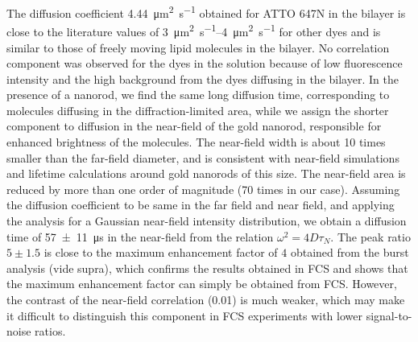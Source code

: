 The diffusion coefficient \SI{4.44}{\um\squared\per\s} obtained for ATTO 647N in the bilayer is close to the literature values of \SIrange{3}{4}{\um\squared\per\s}\cite{mach2010lipid} for other dyes and is similar to those of freely moving lipid molecules in the bilayer.
No correlation component was observed for the dyes in the solution because of low fluorescence intensity and the high background from the dyes diffusing in the bilayer.
In the presence of a nanorod, we find the same long diffusion time, corresponding to molecules diffusing in the diffraction-limited area, while we assign the shorter component to diffusion in the near-field of the gold nanorod, responsible for enhanced brightness of the molecules.
The near-field width is about 10 times smaller than the far-field diameter, and is consistent with near-field simulations and lifetime calculations around gold nanorods
of this size.\cite{khatua2014resonant,seelig2007nanoparticleinduced}
The near-field area is reduced by more than one order of magnitude (70 times in our case).
Assuming the diffusion coefficient to be same in the far field and near field, and applying the analysis for a Gaussian near-field intensity distribution, we obtain a diffusion 
time of \SI[separate-uncertainty = true]{57(11)}{\us} in the near-field from the relation $\omega^2=4D\tau_N$.
The peak ratio $5\pm1.5$ is close to the maximum enhancement factor of $4$ obtained from the burst analysis (vide supra), which confirms the results 
obtained in FCS and shows that the maximum enhancement factor can simply be obtained from FCS.
However, the contrast of the near-field correlation (0.01) is much weaker, which may make it difficult to distinguish this component in FCS experiments with lower signal-to-noise ratios.


